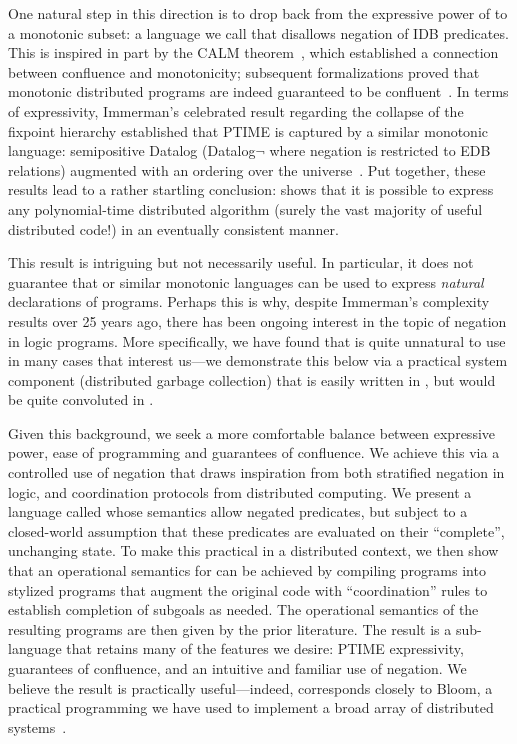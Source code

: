 One natural step in this direction is to drop back from the expressive power of \lang to a monotonic subset: a language we call \slang that disallows negation of IDB predicates.  This is inspired in part by the CALM theorem~\cite{cidr11, declarative-imperative}, which established a connection between confluence
and monotonicity; subsequent formalizations proved that monotonic distributed programs are indeed guaranteed to be confluent~\cite{Abiteboul2011,relational-transducers}.  
In terms of expressivity, Immerman's celebrated result regarding the collapse of the fixpoint hierarchy established that PTIME is captured by a similar monotonic language: semipositive Datalog (Datalog$\lnot$ where negation is restricted to EDB relations) augmented with an ordering over the universe~\cite{immerman-ptime}.  Put together, these results lead to a rather startling conclusion: \slang shows that it is possible to express any polynomial-time distributed algorithm (surely the vast majority of useful distributed code!) in an eventually consistent manner.

This result is intriguing but not necessarily useful.  In particular, it does not guarantee that \slang or similar monotonic languages can be used to express {\em natural} declarations of programs. Perhaps this is why, despite Immerman's complexity results over 25 years ago, there has been ongoing interest in the topic of negation in logic programs.  More specifically, we have found that \slang is quite unnatural to use in many cases that interest us---we demonstrate this below via a practical system component (distributed garbage collection) that is easily written in \lang, but would be quite convoluted in \slang.

Given this background, we seek a more comfortable balance between expressive power, ease of programming and guarantees of confluence.  We achieve this via a controlled use of negation that draws inspiration from both stratified negation in logic, and coordination protocols from distributed computing.  We present a language called \plang whose semantics allow negated predicates, but subject to a closed-world assumption that these predicates are evaluated on their ``complete'', unchanging state.  To make this practical in a distributed context, we then show that an operational semantics for \plang can be achieved by compiling \plang programs into stylized \lang programs that augment the original code with ``coordination'' rules to establish completion of subgoals as needed. The operational semantics of the resulting \lang programs are then given by the prior literature.  The result is a sub-language that retains many of the features we desire: PTIME expressivity, guarantees of confluence, and an intuitive and familiar use of negation.  We believe the result is practically useful---indeed, \plang corresponds closely to Bloom, a practical programming we have used to implement a broad array of distributed systems~\cite{bloom}.

